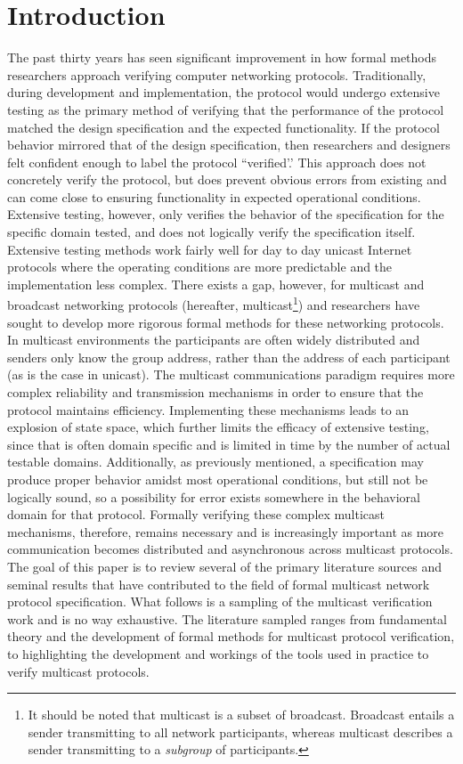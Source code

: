 \documentclass[10pt, journal]{IEEEtran}
\begin{document}
\section{Introduction}
The past thirty years has seen significant improvement in how formal methods researchers approach verifying computer networking protocols. Traditionally, during development and implementation, the protocol would undergo extensive testing as the primary method of verifying that the performance of the protocol matched the design specification and the expected functionality. If the protocol behavior mirrored that of the design specification, then researchers and designers felt confident enough to label the protocol ``verified'.' This approach does not concretely verify the protocol, but does prevent obvious errors from existing and can come close to ensuring functionality in expected operational conditions. Extensive testing, however, only verifies the behavior of the specification for the specific domain tested, and does not logically verify the specification itself.
\bigbreak
Extensive testing methods work fairly well for day to day unicast Internet protocols where the operating conditions are more predictable and the implementation less complex. There exists a gap, however, for multicast and broadcast networking protocols (hereafter, multicast\footnote{It should be noted that multicast is a subset of broadcast. Broadcast entails a sender transmitting to all network participants, whereas multicast describes a sender transmitting to a \textit{subgroup} of participants.}) and researchers have sought to develop more rigorous formal methods for these networking protocols. In multicast environments the participants are often widely distributed and senders only know the group address, rather than the address of each participant (as is the case in unicast). The multicast communications paradigm requires more complex reliability and transmission mechanisms in order to ensure that the protocol maintains efficiency. Implementing these mechanisms leads to an explosion of state space, which further limits the efficacy of extensive testing, since that is often domain specific and is limited in time by the number of actual testable domains. Additionally, as previously mentioned, a specification may produce proper behavior amidst most operational conditions, but still not be logically sound, so a possibility for error exists somewhere in the behavioral domain for that protocol. Formally verifying these complex multicast mechanisms, therefore, remains necessary and is increasingly important as more communication becomes distributed and asynchronous across multicast protocols.
\bigbreak
The goal of this paper is to review several of the primary literature sources and seminal results that have contributed to the field of formal multicast network protocol specification. What follows is a sampling of the multicast verification work and is no way exhaustive. The literature sampled ranges from fundamental theory and the development of formal methods for multicast protocol verification, to highlighting the development and workings of the tools used in practice to verify multicast protocols.
\end{document}
